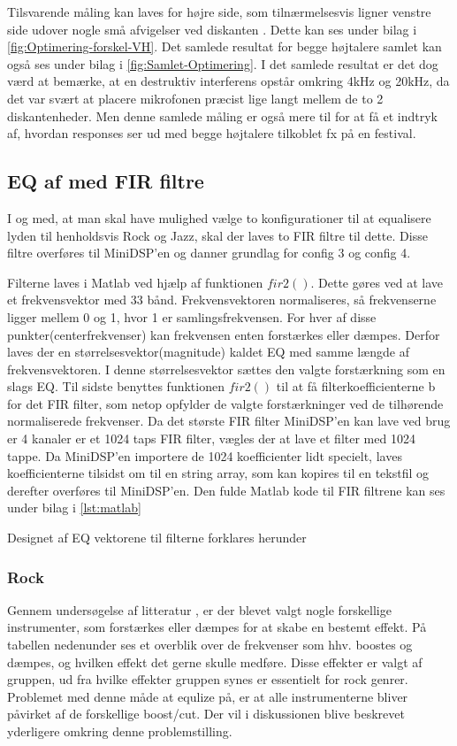 Tilsvarende måling kan laves for højre side, som tilnærmelsesvis ligner venstre side udover nogle små afvigelser ved diskanten . Dette kan ses under bilag i \autoref{fig:Optimering-forskel-VH}. Det samlede resultat for begge højtalere samlet kan også ses under bilag i \autoref{fig:Samlet-Optimering}. I det samlede resultat er det dog værd at bemærke, at en destruktiv interferens opstår omkring 4kHz og 20kHz, da det var svært at placere mikrofonen præcist lige langt mellem de to 2 diskantenheder. Men denne samlede måling er også mere til for at få et indtryk af, hvordan responses ser ud med begge højtalere tilkoblet fx på en festival.

\subsection{EQ af med FIR filtre}
I og med, at man skal have mulighed vælge to konfigurationer til at equalisere lyden til henholdsvis Rock og Jazz, skal der laves to FIR filtre til dette. Disse filtre overføres til MiniDSP'en og danner grundlag for config 3 og config 4.

Filterne laves i Matlab ved hjælp af funktionen $fir2()$. Dette gøres ved at lave et frekvensvektor med 33 bånd. Frekvensvektoren normaliseres, så frekvenserne ligger mellem 0 og 1, hvor 1 er samlingsfrekvensen. For hver af disse punkter(centerfrekvenser) kan frekvensen enten forstærkes eller dæmpes. Derfor laves der en størrelsesvektor(magnitude) kaldet EQ med samme længde af frekvensvektoren. I denne størrelsesvektor sættes den valgte forstærkning som en slags EQ. Til sidste benyttes funktionen $fir2()$ til at få filterkoefficienterne b for det FIR filter, som netop opfylder de valgte forstærkninger ved de tilhørende normaliserede frekvenser. Da det største FIR filter MiniDSP'en kan lave ved brug er 4 kanaler er et 1024 taps FIR filter, vægles der at lave et filter med 1024 tappe. Da MiniDSP'en importere de 1024 koefficienter lidt specielt, laves koefficienterne tilsidst om til en string array, som kan kopires til en tekstfil og derefter overføres til MiniDSP'en. Den fulde Matlab kode til FIR filtrene kan ses under bilag i \autoref{lst:matlab}
  

Designet af EQ vektorene til filterne forklares herunder


\subsubsection{Rock}
Gennem undersøgelse af litteratur \cite[chapter 12]{HomeStudio}, er der blevet valgt nogle forskellige instrumenter, som forstærkes eller dæmpes for at skabe en bestemt effekt. På tabellen nedenunder ses et overblik over de frekvenser som hhv. boostes og dæmpes, og hvilken effekt det  gerne skulle medføre. Disse effekter er valgt af gruppen, ud fra hvilke effekter gruppen synes er essentielt for rock genrer. Problemet med denne måde at equlize på, er at alle instrumenterne bliver påvirket af de forskellige boost/cut. Der vil i diskussionen blive beskrevet yderligere omkring denne problemstilling. 

